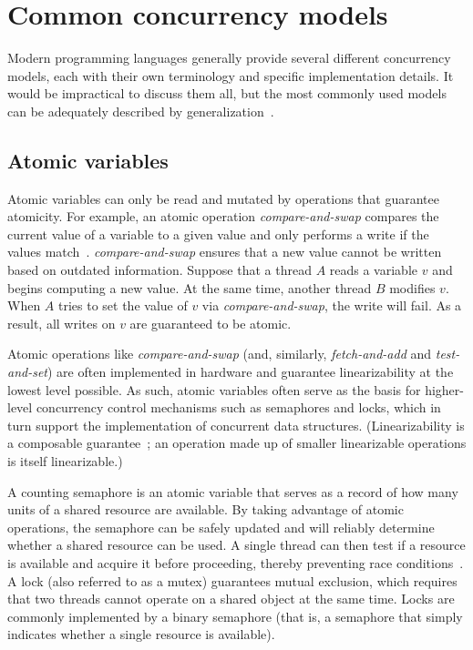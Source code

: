 \documentclass{sig-alternate}
\begin{document}
\section{Common concurrency models}

Modern programming languages generally provide several different concurrency models, each with their own terminology and specific implementation details. It would be impractical to discuss them all, but the most commonly used models can be adequately described by generalization~\cite{Swalens2014}.

\subsection{Atomic variables}

Atomic variables can only be read and mutated by operations that guarantee atomicity. For example, an atomic operation \emph{compare-and-swap} compares the current value of a variable to a given value and only performs a write if the values match~\cite{Swalens2014}. \emph{compare-and-swap} ensures that a new value cannot be written based on outdated information. Suppose that a thread $A$ reads a variable $v$ and begins computing a new value. At the same time, another thread $B$ modifies $v$. When $A$ tries to set the value of $v$ via \emph{compare-and-swap}, the write will fail. As a result, all writes on $v$ are guaranteed to be atomic.

Atomic operations like \emph{compare-and-swap} (and, similarly, \emph{fetch-and-add} and \emph{test-and-set}) are often implemented in hardware and guarantee linearizability at the lowest level possible. As such, atomic variables often serve as the basis for higher-level concurrency control mechanisms such as semaphores and locks, which in turn support the implementation of concurrent data structures. (Linearizability is a composable guarantee~\cite{Herlihy1990}; an operation made up of smaller linearizable operations is itself linearizable.)

A counting semaphore is an atomic variable that serves as a record of how many units of a shared resource are available. By taking advantage of atomic operations, the semaphore can be safely updated and will reliably determine whether a shared resource can be used. A single thread can then test if a resource is available and acquire it before proceeding, thereby preventing race conditions~\cite{Swalens2014}. A lock (also referred to as a mutex) guarantees mutual exclusion, which requires that two threads cannot operate on a shared object at the same time. Locks are commonly implemented by a binary semaphore (that is, a semaphore that simply indicates whether a single resource is available).
\end{document}
